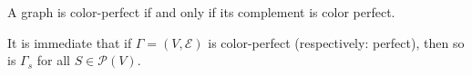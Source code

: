 A graph is color-perfect if and only if its complement is color perfect.

It is immediate that if $\Gamma = (V, \mathcal{E})$ is color-perfect (respectively: perfect), then so is $\Gamma_s$ for all $S \in \mathcal{P}(V)$.

